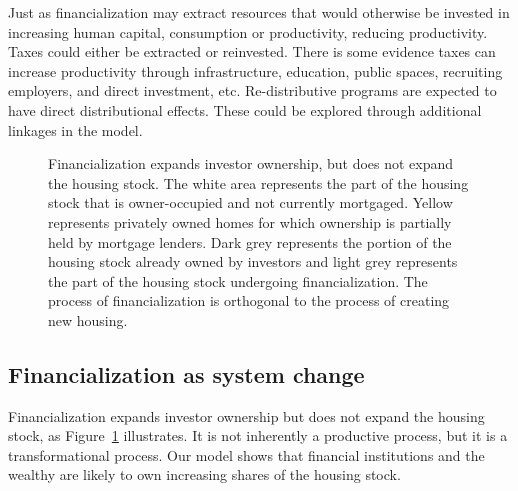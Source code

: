 Just as financialization may extract resources that would otherwise be invested in increasing human capital, consumption or productivity, reducing productivity. Taxes could either be extracted or reinvested. There is some evidence taxes can increase productivity through infrastructure, education, public spaces, recruiting employers, and direct investment, etc. Re-distributive programs are expected to have direct distributional effects. These could be explored through additional linkages in the model.



\begin{figure}[ht]
\begin{center}

\end{center}
\caption[Financialization expands investor ownership but does not expand the housing stock]{Financialization expands investor ownership, but does not expand the housing stock. The white area represents the part of the housing stock that is owner-occupied and not currently mortgaged. Yellow represents privately owned homes for which ownership is partially held by mortgage lenders. Dark grey represents the portion of the housing stock already owned by investors and light grey represents the part of the housing stock undergoing financialization. The process of financialization is orthogonal to the process of creating new housing.} 
\label{fig-financialization-expansion}
\end{figure}%


\subsection{Financialization as system change} \label{section-system}
Financialization expands investor ownership but does not expand the housing
stock, as Figure~\ref{fig-financialization-expansion} illustrates. It is not inherently a productive process, but it is a transformational process. Our model shows that financial institutions and the wealthy are likely to own increasing shares of the housing stock. 

